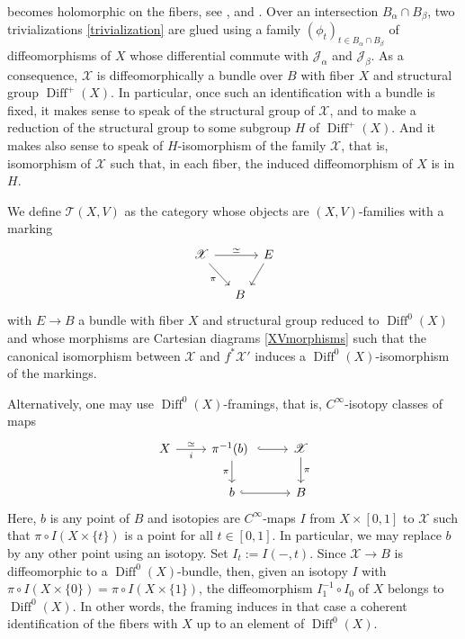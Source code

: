 \documentclass[JEP,XML,SOM,Unicode]{cedram}
\let\mathcal\mathscr
\DeclareMathOperator{\Diff}{Diff}
\theoremstyle{plain}
\theoremstyle{definition}
\theoremstyle{remark}
\numberwithin{equation}{section}
\newcommand{\D}{\Diff^0(X)}
\begin{document}
becomes holomorphic on the fibers, see \cite[Th.\,4.5]{Cat}, \cite[\S 2.3]{circle} and \cite[Prop.\,1]{DouadyBourbaki}. Over an intersection $B_\alpha\cap B_\beta$, two trivializations \eqref{trivialization} are glued using a family $(\phi_t)_{t\in B_\alpha\cap B_\beta}$ of diffeomorphisms of $X$ whose differential commute with $\mathcal J_\alpha$ and $\mathcal J_\beta$. As a consequence, $\mathcal X$ is diffeomorphically a bundle over $B$ with fiber $X$ and structural group $\Diff^+(X)$. In particular, once such an identification with a bundle is fixed, it makes sense to speak of the structural group of $\mathcal X$, and to make a reduction of the structural group to some subgroup $H$ of $\Diff^+(X)$. And it makes also sense to speak of $H$-isomorphism of the family $\mathcal X$, that is, isomorphism of $\mathcal X$ such that, in each fiber, the induced diffeomorphism of $X$ is in $H$.

We define $\mathcal T(X,V)$ as the category whose objects are $(X,V)$-families with a marking\vspace*{-3pt}
\begin{equation}
\label{XVfamilymarked}
\begin{tikzcd}[column sep=tiny, row sep=normal]
\mathcal X\arrow[rrr,"\simeq"] \arrow[rrd, end anchor = north west,"\pi"'] &&&E\arrow[dl, end anchor = north east]\\
&&B&
\end{tikzcd}
\end{equation}
with $E\to B$ a bundle with fiber $X$ and structural group reduced to $\Diff^0(X)$ and whose morphisms are Cartesian diagrams \eqref{XVmorphisms} such that the canonical isomorphism between $\mathcal X$ and $f^*\mathcal X'$ induces a $\Diff^0(X)$-isomorphism of the markings.

Alternatively, one may use $\D$-framings, that is, $C^\infty$-isotopy classes of maps%
\begin{equation}
\begin{tikzcd}
X \arrow[r,"\simeq", "i"']&\pi^{-1}(b)\ \arrow[d,swap,"\pi"]\arrow[r,hook]&\mathcal X\arrow[d,"\pi"]\\
&b\arrow[r,hook] &B
\end{tikzcd}
\end{equation}
Here, $b$ is any point of $B$ and isotopies are $C^\infty$-maps $I$ from $X\times [0,1]$ to $\mathcal X$ such that $\pi\circ I(X\times\{t\})$ is a point for all $t\in [0,1]$. In particular, we may replace $b$ by any other point using an isotopy. Set $I_t:=I(-,t)$. Since $\mathcal X\to B$ is diffeomorphic to a $\D$-bundle, then, given an isotopy $I$ with $\pi\circ I(X\times\{0\})=\pi\circ I(X\times\{1\})$, the diffeomorphism $I_1^{-1}\circ I_0$ of $X$ belongs to $\D$. In other words, the framing induces in that case a coherent identification of the fibers with $X$ up to an element of $\D$.
\end{document}
